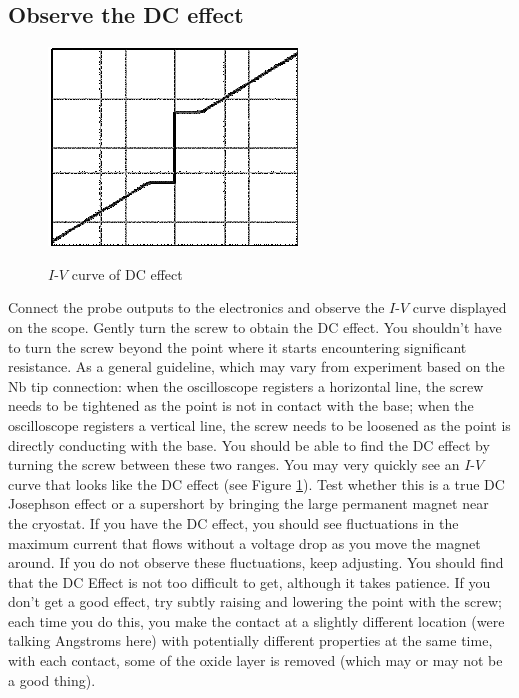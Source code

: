 \documentclass{../lab}
\begin{document}

\subsection{Observe the DC effect}

\begin{figure}[h]
    \centering
    \href{http://experimentationlab.berkeley.edu/sites/default/files/images/250px-JOS15.gif}{\includegraphics[width=0.5\linewidth]{images/250px-JOS15.png}}
    \caption{$I$-$V$ curve of DC effect}
    \label{fig:IVCurveOfDCEffect}
\end{figure}

Connect the probe outputs to the electronics and observe the $I$-$V$ curve displayed on the scope. Gently turn the screw to obtain the DC effect. You shouldn't have to turn the screw beyond the point where it starts encountering significant resistance. As a general guideline, which may vary from experiment based on the Nb tip connection: when the oscilloscope registers a horizontal line, the screw needs to be tightened as the point is not in contact with the base; when the oscilloscope registers a vertical line, the screw needs to be loosened as the point is directly conducting with the base. You should be able to find the DC effect by turning the screw between these two ranges. You may very quickly see an $I$-$V$ curve that looks like the DC effect (see Figure \ref{fig:IVCurveOfDCEffect}). Test whether this is a true DC Josephson effect or a supershort by bringing the large permanent magnet near the cryostat. If you have the DC effect, you should see fluctuations in the maximum current that flows without a voltage drop as you move the magnet around. If you do not observe these fluctuations, keep adjusting. You should find that the DC Effect is not too difficult to get, although it takes patience. If you don't get a good effect, try subtly raising and lowering the point with the screw; each time you do this, you make the contact at a slightly different location (were talking Angstroms here) with potentially different properties at the same time, with each contact, some of the oxide layer is removed (which may or may not be a good thing).
\end{document}
